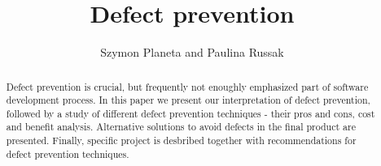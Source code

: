 \documentclass[letterpaper, 10 pt, conference]{ieeeconf}  %
\title{\LARGE \bf
Defect prevention}
\author{Szymon Planeta and Paulina Russak%
}
\begin{document}
\maketitle
\thispagestyle{empty}
\pagestyle{empty}


\begin{abstract}

	Defect prevention is crucial, but frequently not enoughly emphasized part of software development process. In this paper we present our interpretation of defect prevention, followed by a study of different defect prevention techniques - their pros and cons, cost and benefit analysis. Alternative solutions to avoid defects in the final product are presented. Finally, specific project is desbribed together with recommendations for defect prevention techniques.

\end{abstract}











\end{document}
